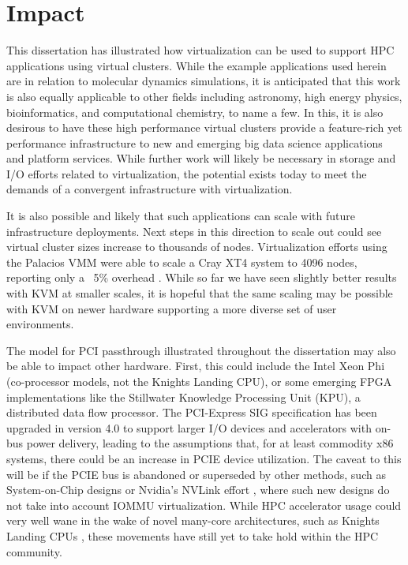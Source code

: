 \section{Impact}
\label{sec:impact}

This dissertation has illustrated how virtualization can be used to support HPC applications using virtual clusters.  While the example applications used herein are in relation to molecular dynamics simulations, it is anticipated that this work is also equally applicable to other fields including astronomy, high energy physics, bioinformatics, and computational chemistry, to name a few. In this, it is also desirous to have these high performance virtual clusters provide a feature-rich yet performance infrastructure to new and emerging big data science applications and platform services.  While further work will likely be necessary in storage and I/O efforts related to virtualization, the potential exists today to meet the demands of a convergent infrastructure with virtualization.   

It is also possible and likely that such applications can scale with future infrastructure deployments.  Next steps in this direction to scale out could see virtual cluster sizes increase to thousands of nodes. Virtualization efforts using the Palacios VMM were able to scale a Cray XT4 system to 4096 nodes, reporting only a ~5\% overhead \cite{lange2011minimal}. While so far we have seen slightly better results with KVM at smaller scales, it is hopeful that the same scaling may be possible with KVM on newer hardware supporting a more diverse set of user environments.  

The model for PCI passthrough illustrated throughout the dissertation may also be able to impact other hardware. First, this could include the Intel Xeon Phi (co-processor models, not the Knights Landing CPU), or some emerging FPGA implementations like the Stillwater Knowledge Processing Unit (KPU), a distributed data flow processor.  The PCI-Express SIG specification has been upgraded in version 4.0 to support larger I/O devices and accelerators with on-bus power delivery, leading to the assumptions that, for at least commodity x86 systems, there could be an increase in PCIE device utilization. The caveat to this will be if the PCIE bus is abandoned or superseded by other methods, such as System-on-Chip designs or Nvidia's NVLink effort \cite{agarwal2015unlocking}, where such new designs do not take into account IOMMU virtualization.  While HPC accelerator usage could very well wane in the wake of novel many-core architectures, such as Knights Landing CPUs \cite{hemmert2016trinity}, these movements have still yet to take hold within the HPC community.  

